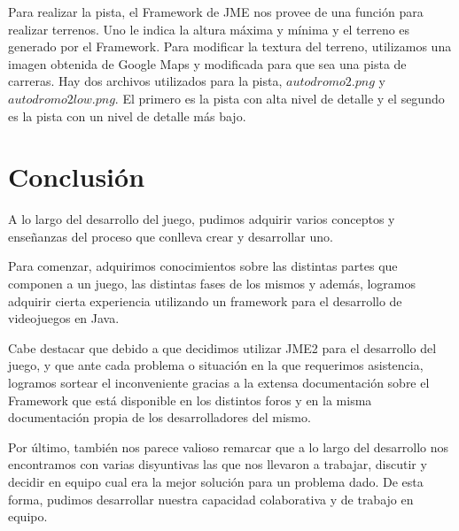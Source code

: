 \documentclass[a4paper,10pt]{article}
\begin{document}
Para realizar la pista, el Framework de JME nos provee de una funci\'on para
realizar terrenos.  Uno le indica la altura m\'axima y m\'inima y el terreno es
generado por el Framework.  Para modificar la textura del terreno, utilizamos
una imagen obtenida de Google Maps y modificada para que sea una pista de
carreras.  Hay dos archivos utilizados para la pista, $autodromo2.png$ y
$autodromo2low.png$.  El primero es la pista con alta nivel de detalle y el
segundo es la pista con un nivel de detalle m\'as bajo.

\section{Conclusi\'on}
\label{conclusiones}

A lo largo del desarrollo del juego, pudimos adquirir varios conceptos y
ense\~nanzas del proceso que conlleva crear y desarrollar uno.

Para comenzar, adquirimos conocimientos sobre las distintas partes que componen
a un juego, las distintas fases de los mismos y adem\'as, logramos adquirir
cierta experiencia utilizando un framework para el desarrollo de videojuegos en
Java.

Cabe destacar que debido a que decidimos utilizar JME2 para el
desarrollo
del juego, y que ante cada problema o situaci\'on en la que
requerimos asistencia,
logramos
sortear el inconveniente gracias a la extensa documentaci\'on sobre el Framework
que est\'a disponible en los distintos foros y en la misma documentaci\'on
propia
de los desarrolladores del mismo.

Por \'ultimo, tambi\'en nos parece valioso remarcar que a lo largo del
desarrollo nos encontramos con varias disyuntivas las que nos llevaron a
trabajar, discutir y decidir en equipo cual era la mejor soluci\'on para un
problema dado.  De esta forma, pudimos desarrollar nuestra capacidad
colaborativa y de trabajo en equipo.
\end{document}
